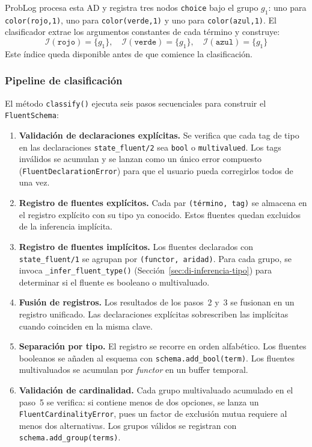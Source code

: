 ProbLog procesa esta AD y registra tres nodos \texttt{choice} bajo el grupo
$g_1$: uno para \texttt{color(rojo,1)}, uno para \texttt{color(verde,1)} y uno
para \texttt{color(azul,1)}. El clasificador extrae los argumentos constantes
de cada término y construye:
\[
    \mathcal{I}(\texttt{rojo}) = \{g_1\}, \quad
    \mathcal{I}(\texttt{verde}) = \{g_1\}, \quad
    \mathcal{I}(\texttt{azul}) = \{g_1\}
\]
Este índice queda disponible antes de que comience la clasificación.

\subsubsection{Pipeline de clasificación}
\label{sec:di-pipeline-clasificacion}

El método \texttt{classify()} ejecuta seis pasos secuenciales para construir el
\texttt{FluentSchema}:

\begin{enumerate}
    \item \textbf{Validación de declaraciones explícitas.} Se verifica que cada tag
        de tipo en las declaraciones \texttt{state\_fluent/2} sea \texttt{bool} o
        \texttt{multivalued}. Los tags inválidos se acumulan y se lanzan como un
        único error compuesto (\texttt{FluentDeclarationError}) para que el usuario
        pueda corregirlos todos de una vez.

    \item \textbf{Registro de fluentes explícitos.} Cada par
        \texttt{(término, tag)} se almacena en el registro explícito con su tipo
        ya conocido. Estos fluentes quedan excluidos de la inferencia implícita.

    \item \textbf{Registro de fluentes implícitos.} Los fluentes declarados con
        \texttt{state\_fluent/1} se agrupan por \texttt{(functor, aridad)}. Para
        cada grupo, se invoca \texttt{\_infer\_fluent\_type()}
        (Sección~\ref{sec:di-inferencia-tipo}) para determinar si el fluente es
        booleano o multivaluado.

    \item \textbf{Fusión de registros.} Los resultados de los pasos~2 y~3 se
        fusionan en un registro unificado. Las declaraciones explícitas
        sobrescriben las implícitas cuando coinciden en la misma clave.

    \item \textbf{Separación por tipo.} El registro se recorre en orden alfabético.
        Los fluentes booleanos se añaden al esquema con
        \texttt{schema.add\_bool(term)}. Los fluentes multivaluados se acumulan por
        \textit{functor} en un buffer temporal.

    \item \textbf{Validación de cardinalidad.} Cada grupo multivaluado acumulado
        en el paso~5 se verifica: si contiene menos de dos opciones, se lanza un
        \texttt{FluentCardinalityError}, pues un factor de exclusión mutua requiere
        al menos dos alternativas. Los grupos válidos se registran con
        \texttt{schema.add\_group(terms)}.
\end{enumerate}


